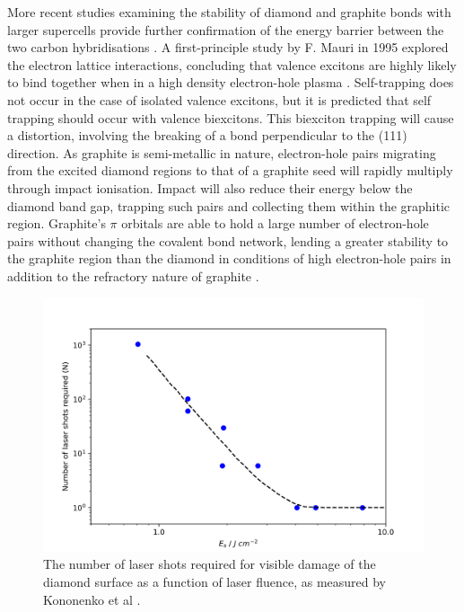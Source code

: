 \begin{refsection}
More recent studies examining the stability of diamond and graphite bonds with larger supercells provide further confirmation of the energy barrier between the two carbon hybridisations \cite{popov:2019,grochala:2014}. A first-principle study by F. Mauri in 1995 explored the electron lattice interactions, concluding that valence excitons are highly likely to bind together when in a high density electron-hole plasma \cite{mauri:1995}. Self-trapping does not occur in the case of isolated valence excitons, but it is predicted that self trapping should occur with valence biexcitons. This biexciton trapping will cause a distortion, involving the breaking of a bond perpendicular to the (111) direction. As graphite is semi-metallic in nature, electron-hole pairs migrating from the excited diamond regions to that of a graphite seed will rapidly multiply through impact ionisation. Impact will also reduce their energy below the diamond band gap, trapping such pairs and collecting them within the graphitic region. Graphite's $\pi$ orbitals are able to hold a large number of electron-hole pairs without changing the covalent bond network, lending a greater stability to the graphite region than the diamond in conditions of high electron-hole pairs in addition to the refractory nature of graphite \cite{bennington:2009}.

\begin{figure}
	\centering
	\includegraphics[width=\linewidth]{Chapter2/Figs/Raster/HDfluencevsshots.png}
	\caption{The number of laser shots required for visible damage of the diamond surface as a function of laser fluence, as measured by Kononenko et al \cite{kononenko:2008}.}
	\label{fig:fluencevsshots}
\end{figure}


\end{refsection}
